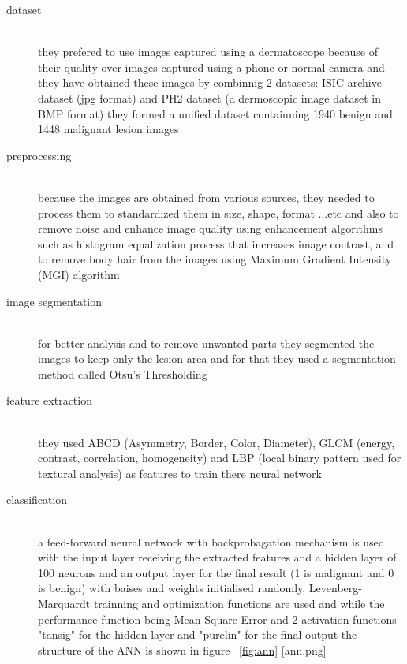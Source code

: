     \begin{description}
    \item [dataset] \hfill \\
    they prefered to use images captured using a dermatoscope because of their quality over images captured using a phone or normal camera and they have obtained these images by combinnig 2 datasets: ISIC archive dataset (jpg format) and PH2 dataset (a dermoscopic image dataset in BMP format) they formed a unified dataset containning 1940 benign and 1448 malignant lesion images

    \item [preprocessing] \hfill \\
    because the images are obtained from various sources, they needed to process them to standardized them in size, shape, format ...etc
    and also to remove noise and enhance image quality using enhancement algorithms such as histogram equalization process that increases image contrast, and to remove body hair from the images using Maximum Gradient Intensity (MGI) algorithm 

    \item [image segmentation] \hfill \\
    for better analysis and to remove unwanted parts they segmented the images to keep only the lesion area and for that they used a segmentation method called Otsu's Thresholding 

    \item [feature extraction] \hfill \\
    they used ABCD (Asymmetry, Border, Color, Diameter), GLCM (energy, contrast, correlation, homogeneity) and LBP (local binary pattern used for textural analysis) as features to train there neural network

    \item [classification] \hfill \\
        a feed-forward neural network with backprobagation mechanism is used with the input layer receiving the extracted features and a hidden layer of 100 neurons and an output layer for the final result (1 is malignant and 0 is benign) with baises and weights initialised randomly, Levenberg-Marquardt trainning and optimization functions are used and while the performance function being Mean Square Error and 2 activation functions "tansig" for the hidden layer and "purelin" for the final output
        the structure of the ANN is shown in figure ~\ref{fig:ann} [ann.png]  
    

\end{description}
